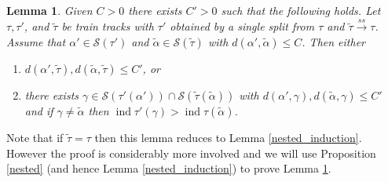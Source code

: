 \documentclass[11pt]{article}
\newtheorem{lemma}[thm]{Lemma}
\theoremstyle{remark}
\def\S{{\mathcal S}}
\def\ind{\operatorname{ind}}
\def\ss{{\overset{ss}\longrightarrow}}
\begin{document}
\begin{lemma}\label{general_induction}
Given $C>0$ there exists $C'>0$ such that the following holds. Let $\tau, \tau'$, and $\tilde\tau$ be train tracks with $\tau'$ obtained by a single split from $\tau$ and $\tilde\tau\ss \tau$. Assume that $\alpha' \in \S(\tau')$ and $\tilde\alpha \in \S(\tilde\tau)$ with $d(\alpha', \tilde\alpha) \le C$. Then either
\begin{enumerate}[(1)]
\item $d(\alpha', \tilde\tau), d(\tilde\alpha, \tilde\tau) \le C'$, or

\item there exists $\gamma \in \S(\tau'(\alpha')) \cap \S(\tilde\tau(\tilde\alpha))$ with $d(\alpha', \gamma), d(\tilde\alpha, \gamma) \le C'$ and if $\gamma \neq \tilde\alpha$ then $\ind \tau'(\gamma) > \ind{\tau}(\tilde\alpha)$.
\end{enumerate}
\end{lemma} 
Note that if $\tilde\tau= \tau$ then this lemma reduces to Lemma \ref{nested_induction}. However the proof is considerably more involved and we will use Proposition \ref{nested} (and hence Lemma \ref{nested_induction}) to prove Lemma \ref{general_induction}.
\end{document}
